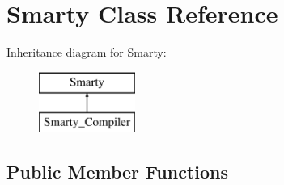 \hypertarget{class_smarty}{\section{\-Smarty \-Class \-Reference}
\label{class_smarty}
}
\-Inheritance diagram for \-Smarty\-:\begin{figure}[H]
\begin{center}
\leavevmode
\includegraphics[height=2.000000cm]{class_smarty}
\end{center}
\end{figure}
\subsection*{\-Public \-Member \-Functions}
